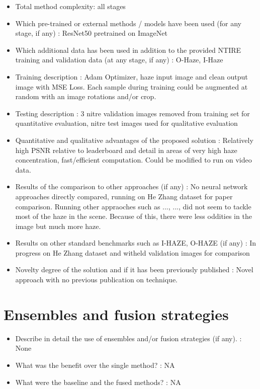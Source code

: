 \documentclass{article}
\begin{document}
\begin{itemize}
\item Total method complexity: all stages
\item Which pre-trained or external methods / models have been used (for any stage, if any) : ResNet50 pretrained on ImageNet
\item Which additional data has been used in addition to the provided NTIRE training and validation data (at any stage, if any) : O-Haze, I-Haze
\item Training description : Adam Optimizer, haze input image and clean output image with MSE Loss. Each sample during training could be augmented at random with an image rotations and/or crop.  
\item Testing description : 3 nitre validation images removed from training set for quantitative evaluation, nitre test images used for qualitative evaluation
\item Quantitative and qualitative advantages of the proposed solution : Relatively high PSNR relative to leaderboard and detail in areas of very high haze concentration, fast/efficient computation. Could be modified to run on video data.
\item Results of the comparison to other approaches (if any) : No neural network approaches directly compared, running on He Zhang dataset for paper comparison. Running other appraoches such as ..., ..., did not seem to tackle most of the haze in the scene. Because of this, there were less oddities in the image but much more haze.
\item Results on other standard benchmarks such as I-HAZE, O-HAZE (if any) : In progress on He Zhang dataset and witheld validation images for comparison
\item Novelty degree of the solution and if it has been previously published : Novel approach with no previous publication on technique.
\end{itemize}


\section{Ensembles and fusion strategies}
\begin{itemize}
\item Describe in detail the use of ensembles and/or fusion strategies (if any). : None
\item What was the benefit over the single method? : NA
\item What were the baseline and the fused methods? : NA
\end{itemize}
\end{document}
